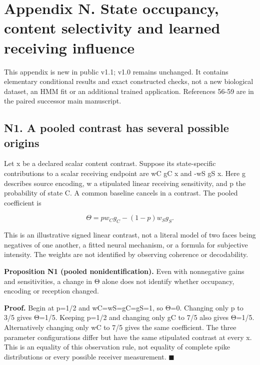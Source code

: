 \documentclass[
  american,
  11pt,
  letterpaper,
]{article}
\begin{document}
\endgroup

\clearpage

\hypertarget{appendix-n}{}

\section{Appendix N. State occupancy, content selectivity and learned receiving influence}\label{appendix-n.-state-occupancy-content-selectivity-and-learned-receiving-influence}

This appendix is new in public v1.1; v1.0 remains unchanged. It contains elementary conditional results and exact constructed checks, not a new biological dataset, an HMM fit or an additional trained application. References 56-59 are in the paired successor main manuscript.

\subsection{N1. A pooled contrast has several possible origins}\label{n1.-a-pooled-contrast-has-several-possible-origins}

Let x be a declared scalar content contrast. Suppose its state-specific contributions to a scalar receiving endpoint are wC gC x and -wS gS x. Here g describes source encoding, w a stipulated linear receiving sensitivity, and p the probability of state C. A common baseline cancels in a contrast. The pooled coefficient is

\begin{equation}
\Theta=pw_Cg_C-(1-p)w_Sg_S.\tag{N1}
\end{equation}

This is an illustrative signed linear contrast, not a literal model of two faces being negatives of one another, a fitted neural mechanism, or a formula for subjective intensity. The weights are not identified by observing coherence or decodability.

\textbf{Proposition N1 (pooled nonidentification).} Even with nonnegative gains and sensitivities, a change in Θ alone does not identify whether occupancy, encoding or reception changed.

\textbf{Proof.} Begin at p=1/2 and wC=wS=gC=gS=1, so Θ=0. Changing only p to 3/5 gives Θ=1/5. Keeping p=1/2 and changing only gC to 7/5 also gives Θ=1/5. Alternatively changing only wC to 7/5 gives the same coefficient. The three parameter configurations differ but have the same stipulated contrast at every x. This is an equality of this observation rule, not equality of complete spike distributions or every possible receiver measurement. \(\blacksquare\)
\end{document}
